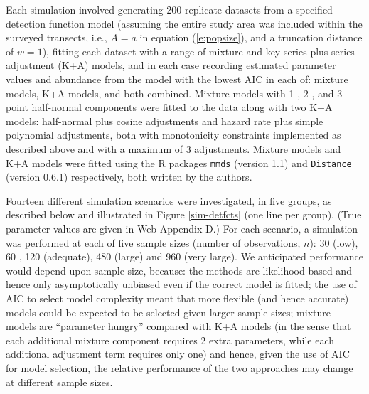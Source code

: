 \documentclass[useAMS,referee,usenatbib]{biom}
\begin{document}
Each simulation involved generating 200 replicate datasets from a specified detection function model (assuming the entire study area was included within the surveyed transects, i.e., $A=a$ in equation (\ref{e:popsize}), and a truncation distance of $w=1$), fitting each dataset with a range of mixture and key series plus series adjustment (K+A) models, and in each case recording estimated parameter values and abundance from the model with the lowest AIC in each of: mixture models, K+A models, and both combined.  Mixture models with 1-, 2-, and 3-point half-normal components were fitted to the data along with two K+A models: half-normal plus cosine adjustments and hazard rate plus simple polynomial adjustments, both with monotonicity constraints implemented as described above and with a maximum of 3 adjustments. Mixture models and K+A models were fitted using the R packages \texttt{mmds} (version 1.1) and \texttt{Distance} (version 0.6.1) respectively, both written by the authors.

Fourteen different simulation scenarios were investigated, in five groups, as described below and illustrated in Figure \ref{sim-detfcts} (one line per group). (True parameter values are given in Web Appendix D.)  For each scenario, a simulation was performed at each of five sample sizes (number of observations, $n$): 30 (low), 60 \citep[recommended minimum for line transects;][]{Buckland:2001vm}, 120 (adequate), 480 (large) and 960 (very large).  We anticipated performance would depend upon sample size, because: the methods are likelihood-based and hence only asymptotically unbiased even if the correct model is fitted; the use of AIC to select model complexity meant that more flexible (and hence accurate) models could be expected to be selected given larger sample sizes; mixture models are ``parameter hungry'' compared with K+A models (in the sense that each additional mixture component requires 2 extra parameters, while each additional adjustment term requires only one) and hence, given the use of AIC for model selection, the relative performance of the two approaches may change at different sample sizes. 
\end{document}
